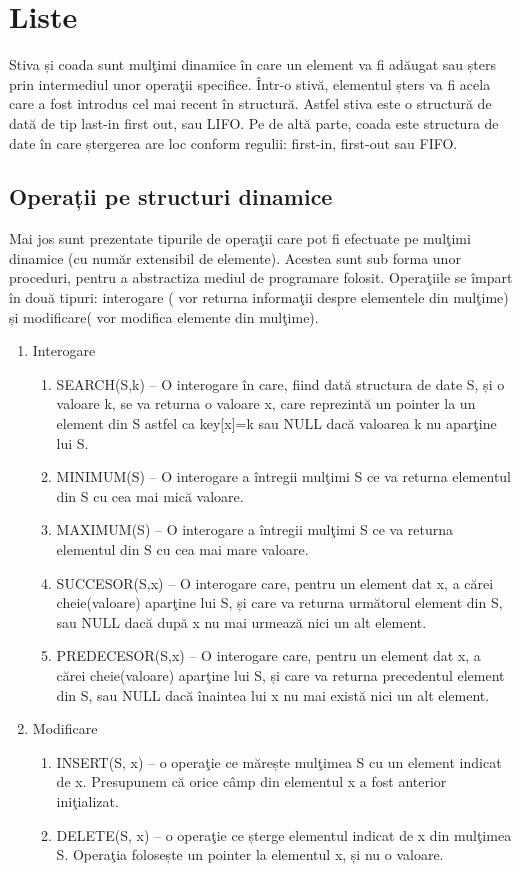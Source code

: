 \section{Liste}

Stiva și coada sunt mulţimi dinamice în care un element va fi adăugat sau șters prin intermediul unor operaţii specifice. Într-o stivă, elementul șters va fi acela care a fost introdus cel mai recent în structură. Astfel stiva este o structură de dată de tip last-in first out, sau LIFO. Pe de altă parte, coada este structura de date în care ștergerea are loc conform regulii: first-in, first-out sau FIFO.

\subsection{Operații pe structuri dinamice}

Mai jos sunt prezentate tipurile de operaţii care pot fi efectuate pe mulţimi dinamice (cu număr extensibil de elemente). Acestea sunt sub forma unor proceduri, pentru a abstractiza mediul de programare folosit. Operaţiile se împart în două tipuri: interogare ( vor returna informaţii despre elementele din mulţime) și modificare( vor modifica elemente din mulţime).

\begin{enumerate}
	\item {
		Interogare
		\begin{enumerate}
			\item {
				SEARCH(S,k) – O interogare în care, fiind dată structura de date S, și o valoare k, se va returna o valoare x, care reprezintă un pointer la un element din S astfel ca key[x]=k sau NULL dacă valoarea k nu aparţine lui S.
			}
			\item {
				MINIMUM(S) – O interogare a întregii mulţimi S ce va returna elementul din S cu cea mai mică valoare.
			}
			\item {
				MAXIMUM(S) – O interogare a întregii mulţimi S ce va returna elementul din S cu cea mai mare valoare.
			}
			\item {
				SUCCESOR(S,x) – O interogare care, pentru un element dat x, a cărei 	cheie(valoare) aparţine lui S, și care va returna următorul element din S, sau NULL dacă după x nu mai urmează nici un alt element.
			}
			\item {
				PREDECESOR(S,x) – O interogare care, pentru un element dat x, a cărei 	cheie(valoare) aparţine lui S, și care va returna precedentul element din S, sau NULL dacă înaintea lui x nu mai există nici un alt element.
			}
		\end{enumerate}
	}
	\item {
		Modificare
		\begin{enumerate}
			\item {
				INSERT(S, x) – o operaţie ce mărește mulţimea S cu un element indicat de x.
				Presupunem că orice câmp din elementul x a fost anterior iniţializat.
			}
			\item {
				DELETE(S, x) – o operaţie ce șterge elementul indicat de x din mulţimea S.
				Operaţia folosește un pointer la elementul x, și nu o valoare.
			}
		\end{enumerate}
	}
\end{enumerate}



